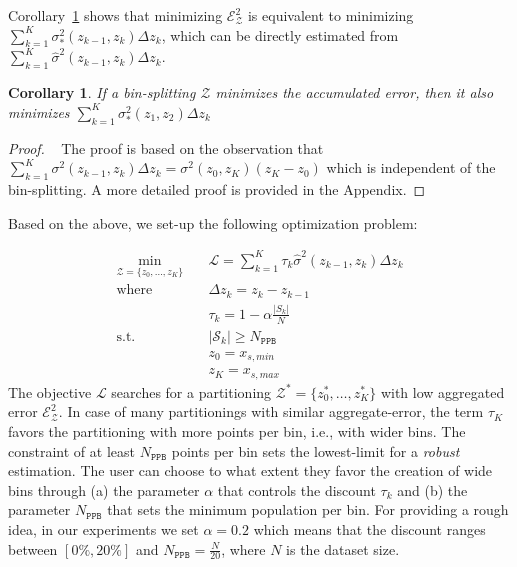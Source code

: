 \documentclass[twoside]{article}
\newtheorem{corollary}{Corollary}[theorem]
\begin{document}
Corollary~\ref{sec:coroll} shows that minimizing
\( \mathcal{E}^2_{\mathcal{Z}} \) is equivalent to minimizing
\(\sum_{k=1}^K \sigma_*^2(z_{k-1}, z_k)\Delta z_k\), which can be directly
estimated from \(\sum_{k=1}^K \hat{\sigma}^2(z_{k-1}, z_k) \Delta z_k \).

\begin{corollary}
  \label{sec:coroll}
  If a bin-splitting \(\mathcal{Z}\) minimizes the accumulated error,
  then it also minimizes
  \(\sum_{k=1}^K\sigma_*^2(z_1, z_2) \Delta z_k \)
\end{corollary}

\begin{proof}
  ~\label{sec:coroll-1} The proof is based on the observation that
  \(\sum_{k=1}^K \sigma^2(z_{k-1}, z_k) \Delta z_k = \sigma^2(z_0,
  z_K) (z_K - z_0)\) which is independent of the bin-splitting. A more
  detailed proof is provided in the Appendix.%
 \end{proof}

Based on the above, we set-up the following optimization problem:

\begin{equation}
  \label{eq:opt}
\begin{aligned}
  \min_{ \mathcal{Z} = \{z_0, \ldots, z_K\}} \quad & \mathcal{L} = \sum_{k=1}^K \tau_k \hat{\sigma}^2(z_{k-1}, z_k) \Delta z_k \\
  \textrm{where} \quad & \Delta z_k = z_k - z_{k-1} \\
  & \tau_k = 1 - \alpha \frac{|S_k|}{N} \\
  \textrm{s.t.} \quad & |\mathcal{S}_k| \geq N_{\mathtt{PPB}}\\
                                     & z_0 = x_{s,min}\\
                                     & z_K = x_{s, max}
\end{aligned}
\end{equation}
%
The objective \(\mathcal{L}\) searches for a partitioning
\(\mathcal{Z}^* = \{ z_0^*, \ldots, z_K^* \} \) with low aggregated error
\(\mathcal{E}_{\mathcal{Z}}^2\). In case of many partitionings with
similar aggregate-error, the term \(\tau_K\) favors the partitioning
with more points per bin, i.e., with wider bins. The constraint of at
least \(N_{\mathtt{PPB}}\) points per bin sets the lowest-limit for a
\textit{robust} estimation. The user can choose to what extent they
favor the creation of wide bins through (a) the parameter \(\alpha\)
that controls the discount \(\tau_k\) and (b) the parameter
\(N_{\mathtt{PPB}}\) that sets the minimum population per bin. For
providing a rough idea, in our experiments we set \(\alpha = 0.2\)
which means that the discount ranges between \([0\%, 20\%]\) and
\(N_{\mathtt{PPB}} = \frac{N}{20}\), where \(N\) is the dataset size.
\end{document}
